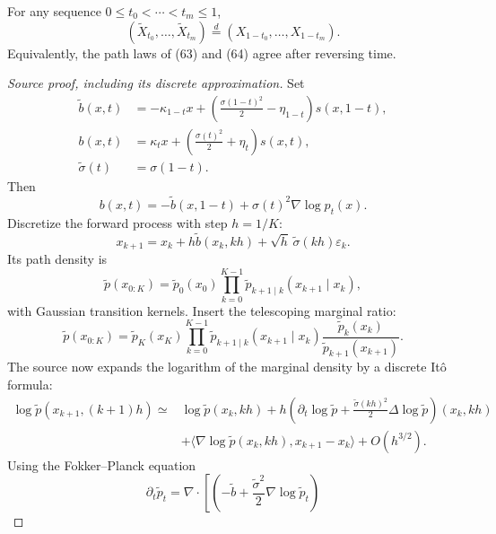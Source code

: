 \begin{proposition}
For any sequence $0\le t_0<\cdots<t_m\le1$,
\[
 (\widetilde X_{t_0},\ldots,\widetilde X_{t_m})
 \stackrel d=
 (X_{1-t_0},\ldots,X_{1-t_m}).
\]
Equivalently, the path laws of (63) and (64) agree after reversing time.
\end{proposition}

\begin{proof}[Source proof, including its discrete approximation]
Set
\begin{align*}
 \widetilde b(x,t)&=-\kappa_{1-t}x+
 \left(\frac{\sigma(1-t)^2}{2}-\eta_{1-t}\right)s(x,1-t),
 \tag{78}\\
 b(x,t)&=\kappa_tx+
 \left(\frac{\sigma(t)^2}{2}+\eta_t\right)s(x,t),
 \tag{79}\\
 \widetilde\sigma(t)&=\sigma(1-t).
 \tag{80}
\end{align*}
Then
\[
 b(x,t)=-\widetilde b(x,1-t)+\sigma(t)^2\nabla\log p_t(x).
\]
Discretize the forward process with step $h=1/K$:
\begin{equation*}
 x_{k+1}=x_k+h\widetilde b(x_k,kh)+\sqrt h\,\widetilde\sigma(kh)\varepsilon_k.
 \tag{81}
\end{equation*}
Its path density is
\begin{equation*}
 \widetilde p(x_{0:K})
 =\widetilde p_0(x_0)\prod_{k=0}^{K-1}
 \widetilde p_{k+1\mid k}(x_{k+1}\mid x_k),
 \tag{82}
\end{equation*}
with Gaussian transition kernels.  Insert the telescoping marginal ratio:
\begin{equation*}
 \widetilde p(x_{0:K})
 =\widetilde p_K(x_K)
 \prod_{k=0}^{K-1}
 \widetilde p_{k+1\mid k}(x_{k+1}\mid x_k)
 \frac{\widetilde p_k(x_k)}{\widetilde p_{k+1}(x_{k+1})}.
 \tag{83}
\end{equation*}
The source now expands the logarithm of the marginal density by a discrete It\^o formula:
\begin{align*}
 \log\widetilde p(x_{k+1},(k+1)h)
 \simeq{}&\log\widetilde p(x_k,kh)
 +h\left(\partial_t\log\widetilde p
 +\frac{\widetilde\sigma(kh)^2}{2}\Delta\log\widetilde p\right)(x_k,kh)\\
 &+\langle\nabla\log\widetilde p(x_k,kh),x_{k+1}-x_k\rangle
 +O(h^{3/2}).
 \tag{84--85}
\end{align*}
Using the Fokker--Planck equation
\begin{equation*}
 \partial_t\widetilde p_t
 =\nabla\cdot\left[
 \left(-\widetilde b+\frac{\widetilde\sigma^2}{2}\nabla\log\widetilde p_t\right)

\end{equation*}
\end{proof}
